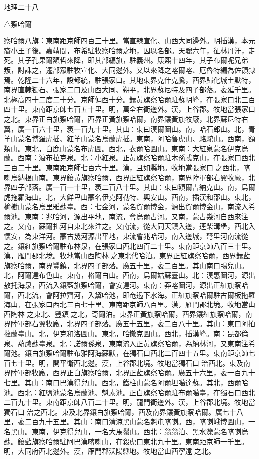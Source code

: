 
\begin{pinyinscope}
地理二十八

△察哈爾

察哈爾八旗：東南距京師四百三十里。當直隸宣化、山西大同邊外。明插漢，本元裔小王子後。嘉靖間，布希駐牧察哈爾之地，因以名部。天聰六年，征林丹汗，走死。其子孔果爾額哲來降，即其部編旗，駐義州。康熙十四年，其子布爾呢兄弟叛，討誅之，遷部眾駐牧宣化、大同邊外。又以來降之喀爾喀、厄魯特編為佐領隸焉。乾隆二十六年，設都統，駐張家口。其地東界克什克騰，西界歸化城土默特，南界直隸獨石、張家二口及山西大同、朔平，北界蘇尼特及四子部落。袤延千里。北極高四十二度二十分。京師偏西十分。鑲黃旗察哈爾駐蘇明峰，在張家口北三百四十里。東南距京師七百五十里。明，萬全右衛邊外。漢，上谷郡。牧地當張家口之北。東界正白旗察哈爾，西界正黃旗察哈爾，南界鑲黃旗牧廠，北界蘇尼特右翼，廣一百六十里，袤一百九十里。其山：東曰漠爾圖山。南，哈石郎山。北，青羊山蒙名博羅虎插、紅羊山蒙名烏蘭虎插。東南，阿哈魯虎山、駱駝山。西南，額類山。東北，白鹿山蒙名布虎圖。西北，衣爾哈圖山。東南：大紅泉蒙名伊克烏蘭。西南：滾布拉克泉。北：小紅泉。正黃旗察哈爾駐木孫忒克山，在張家口西北三百二十里。東南距京師七百六十里。漢，且如縣地。牧地當張家口之西北，喀喇烏納根山南。東界鑲黃旗察哈爾，西界正紅旗察哈爾，南界陸軍部右翼牧廠，北界四子部落。廣一百一十里，袤二百八十里。其山：東曰額爾吉納克山。南，烏爾虎拖羅海山。北，大鮮卑山蒙名伊克阿勒特、興安山。西南，插漢和邵山。東北，榆樹山蒙名烏里雅蘇臺。西：七金河，蒙名賀爾博金，源出賀爾博金山，南流入希爾池。東南：兆哈河，源出平地，南流，會烏爾古河。又南，蒙古幾河自西來注之。又南，蘇爾扎河自東北來注之。又南流，從大同天鎮入邊，逕柴溝堡，西北入懷安，為東洋河。蒙古幾河源出平地，東流會兆哈河，南入邊城，弩里河南流從之。鑲紅旗察哈爾駐布林泉，在張家口西北四百二十里。東南距京師八百三十里。漢，雁門郡北境。牧地當山西陶林之東北代哈泊。東界正紅旗察哈爾，西界鑲藍旗察哈爾，南界豐鎮，北界四子部落。廣五十里，袤二百里。其山南曰鴨兒山。北，阿爾達布色山。東南，格爾白山。西南，烏爾姑蘇臺山。北：漠惠圖河，源出敖托海泉，西流入鑲藍旗察哈爾，會安達河。東南：莽喀圖河，源出正紅旗察哈爾，西北流，會阿拉齊河，入黛哈池，即奄遏下水海。正紅旗察哈爾駐古爾板拖羅海山，在張家口西北三百七十里。東南距京師八百里。漢，雁門郡北境。牧地當山西陶林之東北、豐鎮之北，奇爾泊。東界正黃旗察哈爾，西界鑲紅旗察哈爾，南界陸軍部右翼牧廠，北界四子部落。廣五十五里，袤二百八十里。其山：東曰阿拍撻蘭臺山。北，伊克和洛圖山。東北，哈撤克圖山。西北，插漢峰。南：昆都倫泉、葫蘆蘇臺泉。北：諾爾孫泉，東南流入正黃旗察哈爾，為納林河，又東南注希爾池。鑲白旗察哈爾駐布雅阿海蘇默，在獨石口西北二百四十五里。東南距京師七百七十里。明，開平衛西北邊。漢，上谷郡北境。牧地當獨石口治西北。東及南界陸軍部牧廠，西界正白旗察哈爾，北界正藍旗察哈爾。廣五十六里，袤一百九十七里。其山：南曰巴漢得兒山。西北，鐵柱山蒙名阿爾坦噶達蘇。其北，西爾哈池。西北：紅鹽池蒙名烏蘭池、魁素池。正白旗察哈爾駐布爾噶臺，在獨石口西北二百九十里。東南距京師八百二十里。明，龍門衛邊外。漢，上谷郡北境。牧地當獨石口治之西北。東及北界鑲白旗察哈爾，西及南界鑲黃旗察哈爾。廣七十八里，袤二百九十五里。其山：南曰清涼黑山蒙名魁屯喀喇。西，喀喇峨博圖山，一名黑山。東南，伊克得兒山，一名大馬鬣山。西北：翁翁泊、黑水灤蒙名喀喇烏蘇。鑲藍旗察哈爾駐阿巴漢喀喇山，在殺虎口東北九十里。東南距京師一千里。明，大同府西北邊外。漢，雁門郡沃陽縣地。牧地當山西寧遠之北。
\end{pinyinscope}
